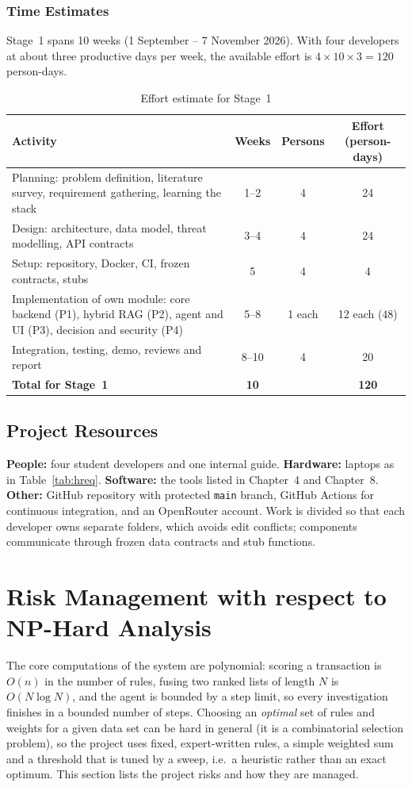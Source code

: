 \documentclass[oneside,a4paper,12pt]{report}
\begin{document}
\subsubsection{Time Estimates}
Stage~1 spans 10 weeks (1 September -- 7 November 2026). With four developers at about three productive days per week, the available effort is $4 \times 10 \times 3 = 120$ person-days.
\begin{table}[H]
\centering\small
\begin{tabularx}{\textwidth}{|X|c|c|c|}
\hline
\textbf{Activity} & \textbf{Weeks} & \textbf{Persons} & \textbf{Effort (person-days)} \\ \hline
Planning: problem definition, literature survey, requirement gathering, learning the stack & 1--2 & 4 & 24 \\ \hline
Design: architecture, data model, threat modelling, API contracts & 3--4 & 4 & 24 \\ \hline
Setup: repository, Docker, CI, frozen contracts, stubs & 5 & 4 & 4 \\ \hline
Implementation of own module: core backend (P1), hybrid RAG (P2), agent and UI (P3), decision and security (P4) & 5--8 & 1 each & 12 each (48) \\ \hline
Integration, testing, demo, reviews and report & 8--10 & 4 & 20 \\ \hline
\textbf{Total for Stage~1} & \textbf{10} & & \textbf{120} \\ \hline
\end{tabularx}
\caption{Effort estimate for Stage~1}
\end{table}

\subsection{Project Resources}
\textbf{People:} four student developers and one internal guide. \textbf{Hardware:} laptops as in Table~\ref{tab:hreq}. \textbf{Software:} the tools listed in Chapter~4 and Chapter~8. \textbf{Other:} GitHub repository with protected \texttt{main} branch, GitHub Actions for continuous integration, and an OpenRouter account. Work is divided so that each developer owns separate folders, which avoids edit conflicts; components communicate through frozen data contracts and stub functions.

\section{Risk Management with respect to NP-Hard Analysis}
The core computations of the system are polynomial: scoring a transaction is $O(n)$ in the number of rules, fusing two ranked lists of length $N$ is $O(N\log N)$, and the agent is bounded by a step limit, so every investigation finishes in a bounded number of steps. Choosing an \emph{optimal} set of rules and weights for a given data set can be hard in general (it is a combinatorial selection problem), so the project uses fixed, expert-written rules, a simple weighted sum and a threshold that is tuned by a sweep, i.e.\ a heuristic rather than an exact optimum. This section lists the project risks and how they are managed.
\end{document}
